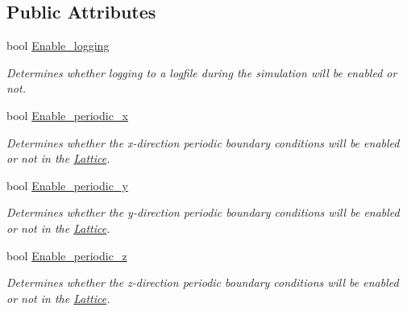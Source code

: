 \subsection*{Public Attributes}
\begin{DoxyCompactItemize}
\item 
\mbox{\label{struct_parameters___simulation_afde5aaac6f3cd226249cb9646a4c8a4b}} 
bool \hyperlink{struct_parameters___simulation_afde5aaac6f3cd226249cb9646a4c8a4b}{Enable\+\_\+logging}
\begin{DoxyCompactList}\small\item\em Determines whether logging to a logfile during the simulation will be enabled or not. \end{DoxyCompactList}\item 
\mbox{\label{struct_parameters___simulation_a5624782454dd99271ad94923f53866b4}} 
bool \hyperlink{struct_parameters___simulation_a5624782454dd99271ad94923f53866b4}{Enable\+\_\+periodic\+\_\+x}
\begin{DoxyCompactList}\small\item\em Determines whether the x-\/direction periodic boundary conditions will be enabled or not in the \hyperlink{class_lattice}{Lattice}. \end{DoxyCompactList}\item 
\mbox{\label{struct_parameters___simulation_a1c3d79a4dcf194f884e8a3d346c2261a}} 
bool \hyperlink{struct_parameters___simulation_a1c3d79a4dcf194f884e8a3d346c2261a}{Enable\+\_\+periodic\+\_\+y}
\begin{DoxyCompactList}\small\item\em Determines whether the y-\/direction periodic boundary conditions will be enabled or not in the \hyperlink{class_lattice}{Lattice}. \end{DoxyCompactList}\item 
\mbox{\label{struct_parameters___simulation_a0d318f1a9eb75fa909b4ae8266696be1}} 
bool \hyperlink{struct_parameters___simulation_a0d318f1a9eb75fa909b4ae8266696be1}{Enable\+\_\+periodic\+\_\+z}
\begin{DoxyCompactList}\small\item\em Determines whether the z-\/direction periodic boundary conditions will be enabled or not in the \hyperlink{class_lattice}{Lattice}. \end{DoxyCompactList}\item 

\end{DoxyCompactItemize}
